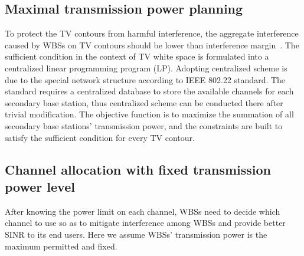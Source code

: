 \subsection{Maximal transmission power planning}
\label{MPowerPlanning}
 
 
To protect the TV contours from harmful interference, the aggregate interference caused by WBSs on TV contours should be lower than interference margin~\cite{multipleIntf_pimrc11}.
The sufficient condition in the context of TV white space is formulated into a centralized linear programming program (\gls{LP}).
Adopting centralized scheme is due to the special network structure according to IEEE 802.22 standard. 
The standard requires a centralized database to store the available channels for each secondary base station, thus centralized scheme can be conducted there after trivial modification.
The objective function is to maximize the summation of all secondary base stations' transmission power, and the constraints are built to satisfy the sufficient condition for every TV contour. %



\subsection{Channel allocation with fixed transmission power level}
\label{CA}
After knowing the power limit on each channel, WBSs need to decide which channel to use so as to mitigate interference among WBSs and provide better SINR to its end users. 
Here we assume WBSs' transmission power is the maximum permitted and fixed.

